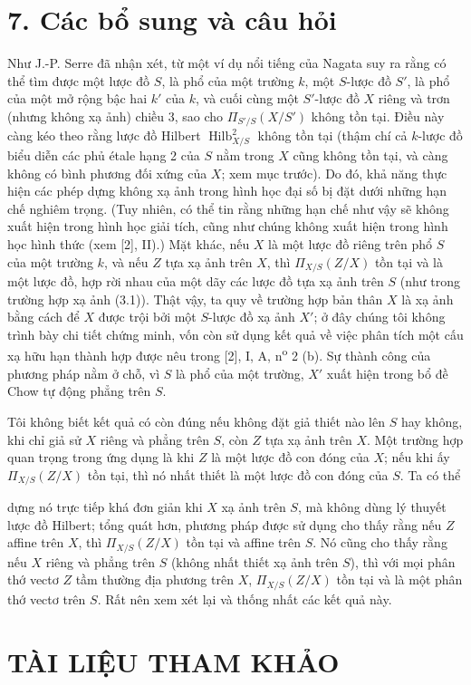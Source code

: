 \documentclass[11pt,twoside,openany]{book}
\numberwithin{equation}{section}
\newcommand{\src}[1]{%
  \phantomsection\hypertarget{src:\fgasourceid:#1}{}%
  \marginpar{\raggedleft\footnotesize\sffamily #1}%
}
\newcommand{\fgasourceid}{unset}
\newcommand{\fsection}[2]{%
  \section*{#1. #2}%
  \addcontentsline{toc}{section}{#1. #2}%
}
\begin{document}
\fsection{7}{Các bổ sung và câu hỏi}

Như J.-P. Serre đã nhận xét, từ một ví dụ nổi tiếng của Nagata suy ra rằng có
thể tìm được một lược đồ $S$, là phổ của một trường $k$, một $S$-lược đồ $S'$,
là phổ của một mở rộng bậc hai $k'$ của $k$, và cuối cùng một $S'$-lược đồ $X$
riêng và trơn (nhưng không xạ ảnh) chiều 3, sao cho $\Pi_{S'/S}(X/S')$ không
tồn tại. Điều này càng kéo theo rằng lược đồ Hilbert
$\operatorname{Hilb}^2_{X/S}$ không tồn tại (thậm chí cả $k$-lược đồ biểu diễn
các phủ étale hạng 2 của $S$ nằm trong $X$ cũng không tồn tại, và càng không có
bình phương đối xứng của $X$; xem mục trước). Do đó, khả năng thực hiện các
phép dựng không xạ ảnh trong hình học đại số bị đặt dưới những hạn chế nghiêm
trọng. (Tuy nhiên, có thể tin rằng những hạn chế như vậy sẽ không xuất hiện
trong hình học giải tích, cũng như chúng không xuất hiện trong hình học hình
thức (xem [2], II).) Mặt khác, nếu $X$ là một lược đồ riêng trên phổ $S$ của
một trường $k$, và nếu $Z$ tựa xạ ảnh trên $X$, thì $\Pi_{X/S}(Z/X)$ tồn tại
và là một lược đồ, hợp rời nhau của một dãy các lược đồ tựa xạ ảnh trên $S$
(như trong trường hợp xạ ảnh (3.1)). Thật vậy, ta quy về trường hợp bản thân
$X$ là xạ ảnh bằng cách để $X$ được trội bởi một $S$-lược đồ xạ ảnh $X'$; ở đây
chúng tôi không trình bày chi tiết chứng minh, vốn còn sử dụng kết quả về việc
phân tích một cấu xạ hữu hạn thành hợp được nêu trong [2], I, A,
n\textsuperscript{o} 2 (b). Sự thành công của phương pháp nằm ở chỗ, vì $S$ là
phổ của một trường, $X'$ xuất hiện trong bổ đề Chow tự động phẳng trên $S$.

Tôi không biết kết quả có còn đúng nếu không đặt giả thiết nào lên $S$ hay
không, khi chỉ giả sử $X$ riêng và phẳng trên $S$, còn $Z$ tựa xạ ảnh trên
$X$. Một trường hợp quan trọng trong ứng dụng là khi $Z$ là một lược đồ con
đóng của $X$; nếu khi ấy $\Pi_{X/S}(Z/X)$ tồn tại, thì nó nhất thiết là một
lược đồ con đóng của $S$. Ta có thể
\src{276}
dựng nó trực tiếp khá đơn giản khi $X$ xạ ảnh trên $S$, mà không dùng lý
thuyết lược đồ Hilbert; tổng quát hơn, phương pháp được sử dụng cho thấy rằng
nếu $Z$ affine trên $X$, thì $\Pi_{X/S}(Z/X)$ tồn tại và affine trên $S$. Nó
cũng cho thấy rằng nếu $X$ riêng và phẳng trên $S$ (không nhất thiết xạ ảnh
trên $S$), thì với mọi phân thớ vectơ $Z$ tầm thường địa phương trên $X$,
$\Pi_{X/S}(Z/X)$ tồn tại và là một phân thớ vectơ trên $S$. Rất nên xem xét
lại và thống nhất các kết quả này.

\section*{TÀI LIỆU THAM KHẢO}
\end{document}
